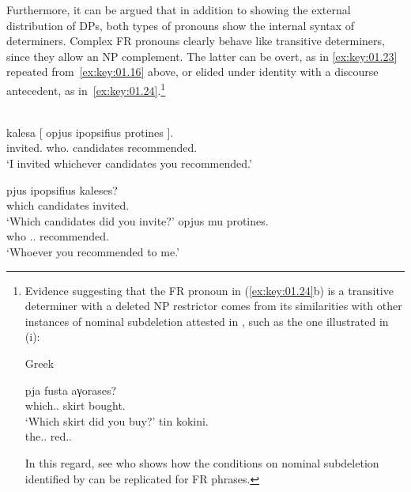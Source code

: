 \documentclass[output=paper]{langsci/langscibook}
\begin{document}
Furthermore, it can be argued that in addition to showing the external
distribution of DPs, both types of pronouns show the internal syntax of
determiners. Complex \gls{FR} pronouns clearly behave like transitive
determiners, since they allow an NP complement. The latter can be overt, as in
\eqref{ex:key:01.23} repeated from~\eqref{ex:key:01.16} above, or elided under
identity with a discourse antecedent, as
in~\eqref{ex:key:01.24}.\footnote{Evidence suggesting that the \gls{FR} pronoun
    in (\ref{ex:key:01.24}b) is a transitive determiner with a deleted NP
    restrictor comes from its similarities with other instances of nominal
    subdeletion attested in , such as the one illustrated in (i):

\begin{exe}
     Greek
    \begin{xlist}
        \ex
		\gll pja fusta aγorases?\\
			which.\glossF.\Sg{} skirt bought.\Ssg{}\\
		\glt \enquote*{Which skirt did you buy?}
        \ex
		\gll tin kokini.\\
			the.\glossF.\Sg{} red.\glossF.\Sg{}\\
    \end{xlist}
\end{exe}

In this regard, see \citet{Daskalaki2009} who shows how the conditions on
nominal subdeletion identified by  \textcite{GiaSta1999} can be
replicated for \gls{FR} phrases.}

\ea {}\label{ex:key:01.23}\\
	\gll kalesa [ opjus ipopsifius protines ].\\
    invited.\Fsg{} {} who.\Acc{} candidates recommended.\Ssg{} {}\\
	\glt \enquote*{I invited whichever candidates you recommended.}
\z

\ea {}\label{ex:key:01.24}
	\ea
		\gll pjus ipopsifius kaleses?\\
			which candidates invited.\Ssg{}\\
		\glt \enquote*{Which candidates did you invite?}
	\ex
		\gll opjus mu protines.\\
			who \Cl.\Fsg.\Gen{} recommended.\Ssg{}\\
		\glt \enquote*{Whoever you recommended to me.}
	\z
\z
\end{document}
